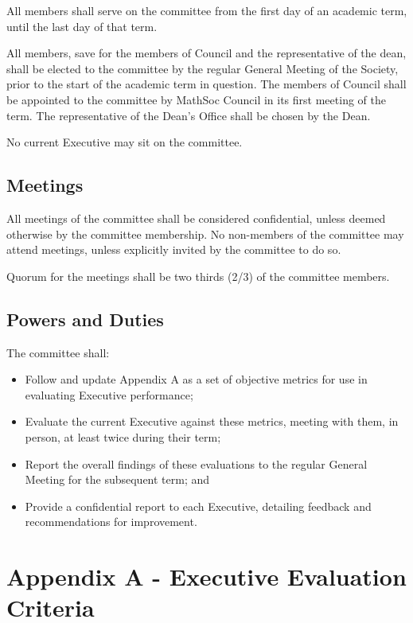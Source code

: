 \documentclass[12pt, letterpaper]{article}
\begin{document}
All members shall serve on the committee from the first day of an academic term, until the last day of that term.

All members, save for the members of Council and the representative of the dean, shall be elected to the committee by the regular General Meeting of the Society, prior to the start of the academic term in question. The members of Council shall be appointed to the committee by MathSoc Council in its first meeting of the term. The representative of the Dean’s Office shall be chosen by the Dean.

No current Executive may sit on the committee.

\subsection*{Meetings}

All meetings of the committee shall be considered confidential, unless deemed otherwise by the committee membership. No non-members of the committee may attend meetings, unless explicitly invited by the committee to do so.

Quorum for the meetings shall be two thirds (2/3) of the committee members.

\subsection*{Powers and Duties}

The committee shall:
\begin{itemize}
	\item Follow and update Appendix A as a set of objective metrics for use in evaluating Executive performance;
	\item Evaluate the current Executive against these metrics, meeting with them, in person, at least twice during their term;
	\item Report the overall findings of these evaluations to the regular General Meeting for the subsequent term;
	and
	\item Provide a confidential report to each Executive, detailing feedback and recommendations for improvement.
\end{itemize}

\section*{Appendix A - Executive Evaluation Criteria}
\end{document}
